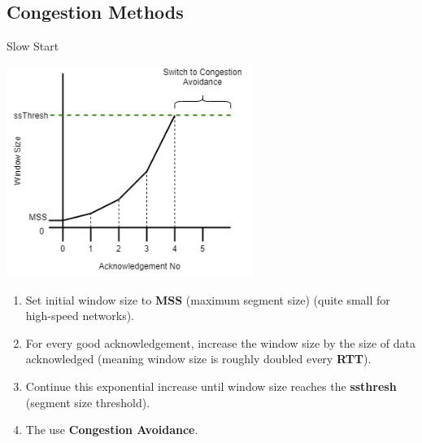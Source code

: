 \subsection{Congestion Methods}
\begin{definitionbox}{Slow Start}
    \begin{center}\includegraphics[width=0.6\textwidth]{transport_layer/images/slow start.png}\end{center}
    \begin{enumerate}
        \setlength\itemsep{0em}
        \item Set initial window size to \textbf{MSS} (maximum segment size) (quite small for high-speed networks).
        \item For every good acknowledgement, increase the window size by the size of data acknowledged (meaning window size is roughly doubled every \textbf{RTT}).
        \item Continue this exponential increase until window size reaches the \textbf{ssthresh} (segment size threshold).
        \item The use \textbf{Congestion Avoidance}.
    \end{enumerate}
\end{definitionbox}
